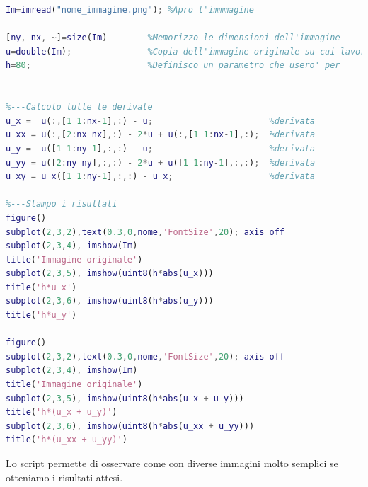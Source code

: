 \begin{lstlisting}[language=MATLAB]
%---Operazioni preliminari
Im=imread("nome_immagine.png");	%Apro l'immmagine

[ny, nx, ~]=size(Im)        %Memorizzo le dimensioni dell'immagine
u=double(Im);               %Copia dell'immagine originale su cui lavorare
h=80;                       %Definisco un parametro che usero' per                               enfatizzare i bordi in fase di stampa 


%---Calcolo tutte le derivate
u_x =  u(:,[1 1:nx-1],:) - u;                       %derivata                                                            prima lungo x
u_xx = u(:,[2:nx nx],:) - 2*u + u(:,[1 1:nx-1],:);  %derivata                                                            seconda lungo x
u_y =  u([1 1:ny-1],:,:) - u;                       %derivata                                                            prima lungo y
u_yy = u([2:ny ny],:,:) - 2*u + u([1 1:ny-1],:,:);  %derivata                                                            seconda lungo y
u_xy = u_x([1 1:ny-1],:,:) - u_x;                   %derivata                                                            seconda mista
   
%---Stampo i risultati
figure()
subplot(2,3,2),text(0.3,0,nome,'FontSize',20); axis off
subplot(2,3,4), imshow(Im)
title('Immagine originale')
subplot(2,3,5), imshow(uint8(h*abs(u_x)))
title('h*u_x')
subplot(2,3,6), imshow(uint8(h*abs(u_y)))
title('h*u_y')

figure()
subplot(2,3,2),text(0.3,0,nome,'FontSize',20); axis off
subplot(2,3,4), imshow(Im)
title('Immagine originale')
subplot(2,3,5), imshow(uint8(h*abs(u_x + u_y)))
title('h*(u_x + u_y)')
subplot(2,3,6), imshow(uint8(h*abs(u_xx + u_yy)))
title('h*(u_xx + u_yy)')
\end{lstlisting}

\vspace{6em}
Lo script permette di osservare come con diverse immagini molto semplici se otteniamo i risultati attesi.\\

